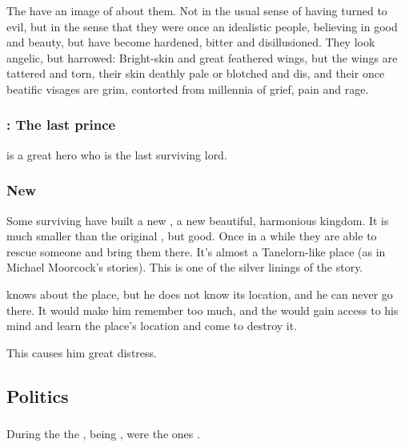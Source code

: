 The \Kezeradi{} have an image of  about them. Not  in the usual sense of having turned to evil, but in the sense that they were once an idealistic people, believing in good and beauty, but have become hardened, bitter and disillusioned. They look angelic, but harrowed: Bright-\coloured skin and great feathered wings, but the wings are tattered and torn, their skin deathly pale or blotched and dis\coloured, and their once beatific visages are grim, contorted from millennia of grief, pain and rage. 





\subsubsection{\Sithiyacaan: The last \Kezeradi{} prince}
 is a great hero who is the last surviving \Kezeradi{} lord. 





\subsubsection{New \Kezerad}
Some surviving \Kezeradi{} have built a new \Kezerad, a new beautiful, harmonious kingdom. It is much smaller than the original \Kezerad, but good. Once in a while they are able to rescue someone and bring them there. It's almost a Tanelorn-like place (as in Michael Moorcock's stories). This is one of the silver linings of the story. 

 knows about the place, but he does not know its location, and he can never go there. It would make him remember too much, and the \Sephiroth{} would gain access to his mind and learn the place's location and come to destroy it. 

This causes him great distress. 









\subsection{Politics}





\subsubsection{\TiphredSerah}
During the  the \TiphredSerah{}, being , were the ones . 
















